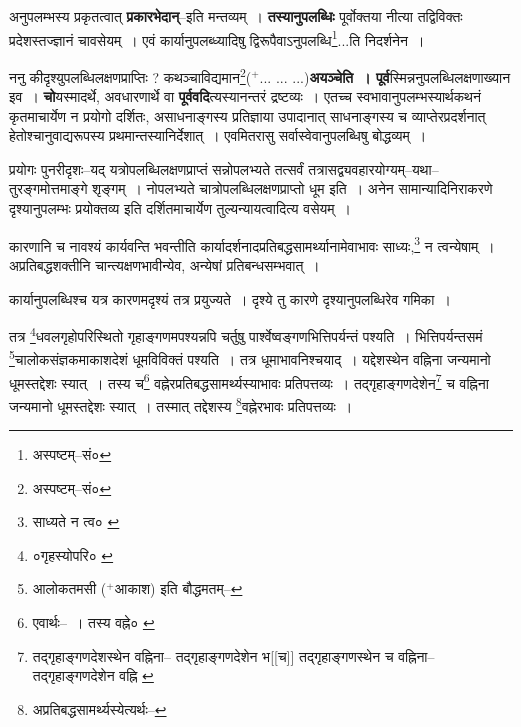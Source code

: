 \documentclass[article,12pt,a4paper]{memoir}
\newcommand{\add}[1]{($^{+}$#1)}
\begin{document}
	  \pstart अनुपलम्भस्य प्रकृतत्वात् \textbf{प्रकारभेदान्}--इति मन्तव्यम् । \textbf{तस्यानुपलब्धिः} पूर्वोक्तया नीत्या तद्विविक्तः प्रदेशस्तज्ज्ञानं चावसेयम् । एवं कार्यानुपलब्ध्यादिषु द्विरूपैवाऽनुपलब्धि\footnote{अस्पष्टम्--सं०}\-...ति निदर्शनेन ।
	\pend
      

	  \pstart ननु कीदृश्युपलब्धिलक्षणप्राप्तिः ? कथञ्चाविद्यमान\footnote{अस्पष्टम्--सं०}\add{... ... ...}\textbf{अयञ्चेति । पूर्व}स्मिन्ननुपलब्धिलक्षणाख्यान इव । \textbf{चो}\leavevmode{}यस्मादर्थे, अवधारणार्थे वा \textbf{पूर्ववदि}त्यस्यानन्तरं द्रष्टव्यः । एतच्च स्वभावानुपलम्भस्यार्थकथनं कृतमाचार्येण न प्रयोगो दर्शितः, असाधनाङ्गस्य प्रतिज्ञाया उपादानात् साधनाङ्गस्य च व्याप्तेरप्रदर्शनात् हेतोश्चानुवाद्यरूपस्य प्रथमान्तस्यानिर्देशात् । एवमितरासु सर्वास्वेवानुपलब्धिषु बोद्धव्यम् ।
	\pend
      

	  \pstart प्रयोगः पुनरीदृशः--यद् यत्रोपलब्धिलक्षणप्राप्तं सन्नोपलभ्यते तत्सर्वं तत्रासद्व्यवहारयोग्यम्--यथा--तुरङ्गमोत्तमाङ्गे शृङ्गम् । नोपलभ्यते चात्रोपलब्धिलक्षणप्राप्तो धूम इति । अनेन सामान्यादिनिराकरणे दृश्यानुपलम्भः प्रयोक्तव्य इति दर्शितमाचार्येण तुल्यन्यायत्वादित्य वसेयम् ।
	\pend
	  \bigskip
	  \begingroup
	

	  \pstart कारणानि च नावश्यं कार्यवन्ति भवन्तीति कार्यादर्शनादप्रतिबद्धसामर्थ्यानामेवाभावः साध्यः,\footnote{साध्यते न त्व० \cite{dp-msC}} न त्वन्येषाम् । अप्रतिबद्धशक्तीनि चान्त्यक्षणभावीन्येव, अन्येषां प्रतिबन्धसम्भवात् ।
	\pend
       

	  \pstart कार्यानुपलब्धिश्च यत्र कारणमदृश्यं तत्र प्रयुज्यते । दृश्ये तु कारणे दृश्यानुपलब्धिरेव गमिका ।
	\pend
       

	  \pstart तत्र \footnote{०गृहस्योपरि० \cite{dp-msB} \cite{dp-msC} \cite{dp-msD}}\-धवलगृहोपरिस्थितो गृहाङ्गणमपश्यन्नपि चर्तुषु पार्श्वेष्वङ्गणभित्तिपर्यन्तं पश्यति । भित्तिपर्यन्तसमं \footnote{आलोकतमसी \add{आकाश} इति बौद्धमतम्--\cite{dp-msD-n}}\-चालोकसंज्ञकमाकाशदेशं धूमविविक्तं पश्यति । तत्र धूमाभावनिश्चयाद् । यद्देशस्थेन वह्निना जन्यमानो धूमस्तद्देशः स्यात् । तस्य च\footnote{एवार्थः--\cite{dp-msD-n} । तस्य वह्ने० \cite{dp-msB}} वह्नेरप्रतिबद्धसामर्थ्यस्याभावः प्रतिपत्तव्यः । तद्गृहाङ्गणदेशेन\footnote{तद्गृहाङ्गणदेशस्थेन वह्निना--\cite{dp-msC} \cite{dp-msD} तद्गृहाङ्गणदेशेन भ[[च]] \cite{dp-msA} तद्गृहाङ्गणस्थेन च वह्निना--\cite{dp-msB} तद्गृहाङ्गणदेशेन वह्नि \cite{dp-edP} \cite{dp-edH} \cite{dp-edE}} च वह्निना जन्यमानो धूमस्तद्देशः स्यात् । तस्मात् तद्देशस्य \footnote{अप्रतिबद्धसामर्थ्यस्येत्यर्थः--\cite{dp-msD-n}}\-वह्नेरभावः प्रतिपत्तव्यः ।
	\pend
       
\end{document}
